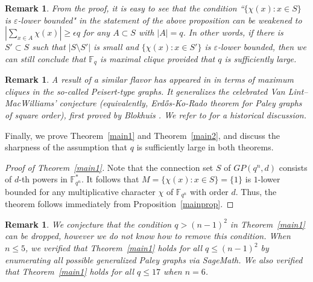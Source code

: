 \documentclass[12pt,reqno]{amsart}
\newtheorem{rem}[thm]{Remark}
\newcommand{\F}{\mathbb{F}}
\begin{document}
\begin{rem}\rm
From the proof, it is easy to see that the condition ``$\{\chi(x): x \in S\}$ is $\varepsilon$-lower bounded" in the statement of the above proposition can be weakened to $|\sum_{x \in A} \chi(x)| \geq \epsilon q$
for any $A \subset S$ with $|A|=q$. In other words, if there is $S' \subset S$ such that $|S \setminus S'|$ is small and $\{\chi(x): x \in S'\}$ is $\varepsilon$-lower bounded, then we can still conclude that $\F_q$ is maximal clique provided that $q$ is sufficiently large.
\end{rem}

\begin{rem}\rm
A result of a similar flavor has appeared in \cite[Theorem 1.3]{AY} in terms of maximum cliques in the so-called Peisert-type graphs. It generalizes the celebrated Van Lint--MacWilliams' conjecture (equivalently, Erd\H{o}s-{K}o-{R}ado theorem for Paley graphs of square order), first proved by Blokhuis \cite{Blo84}. We refer to \cite[Section 2]{AY} for a historical discussion.
\end{rem}

Finally, we prove Theorem~\ref{main1} and Theorem~\ref{main2}, and discuss the sharpness of the assumption that $q$ is sufficiently large in both theorems.

\begin{proof}[Proof of Theorem~\ref{main1}]
Note that the connection set $S$ of $GP(q^n,d)$ consists of $d$-th powers in $\F_{q^n}^*$. It follows that $M=\{\chi(x): x \in S\}=\{1\}$ is $1$-lower bounded for any multiplicative character $\chi$ of $\F_{q^n}$ with order $d$. Thus, the theorem follows immediately from Proposition~\ref{mainprop}.
\end{proof}

\begin{rem}\rm
We conjecture that the condition $q>(n-1)^2$ in Theorem~\ref{main1} can be dropped, however we do not know how to remove this condition. When $n \leq 5$, we verified that Theorem~\ref{main1} holds for all $q \leq (n-1)^2$ by enumerating all possible generalized Paley graphs via SageMath. We also verified that Theorem~\ref{main1} holds for all $q \leq 17$ when $n=6$. 
\end{rem}
\end{document}
